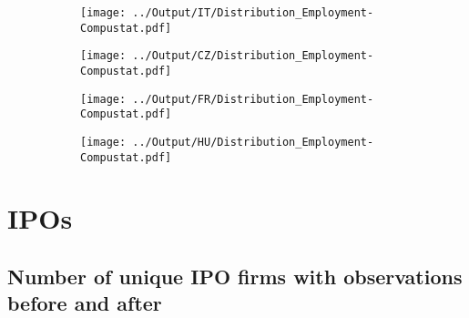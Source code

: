 \documentclass[12pt,notitlepage]{article}
\begin{document}
\begin{figure}[!htpb]
\centering
\caption{Distribution of firms across employment bins (Compustat)}
\begin{subfigure}{.49\textwidth}
    \centering
 \texttt{[image: ../Output/IT/Distribution\_Employment-Compustat.pdf]}
\end{subfigure}%
\begin{subfigure}{.49\textwidth}
    \centering
 \texttt{[image: ../Output/CZ/Distribution\_Employment-Compustat.pdf]}
\end{subfigure}
\begin{subfigure}{.49\textwidth}
    \centering
 \texttt{[image: ../Output/FR/Distribution\_Employment-Compustat.pdf]}
\end{subfigure}%
\begin{subfigure}{.49\textwidth}
    \centering
 \texttt{[image: ../Output/HU/Distribution\_Employment-Compustat.pdf]}
\end{subfigure}
\end{figure}
\pagebreak

\pagebreak


\FloatBarrier
\section{IPOs} %
\label{sec:ipos}
\FloatBarrier




\subsection{Number of unique IPO firms with observations before and after}

\begin{table}[!htpb]
    \label{tab:my_label}
\end{table}
\end{document}
